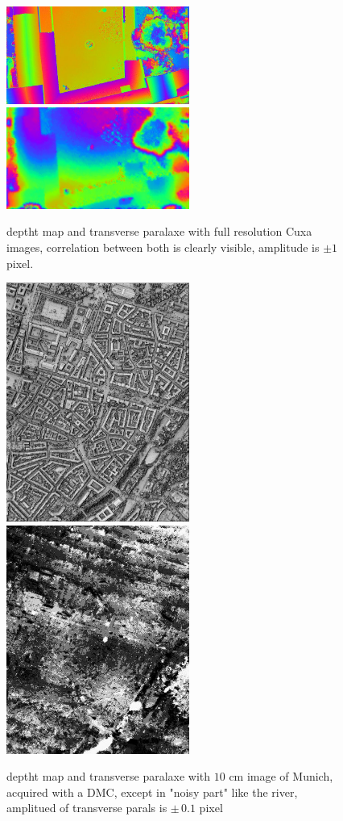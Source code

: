 \begin{figure}
\begin{center}
\includegraphics[width=60mm]{FIGS/TestOri/FullCuxPx1.jpg}
\includegraphics[width=60mm]{FIGS/TestOri/FullCuxPx2.jpg}
\end{center}
\caption{deptht map and transverse paralaxe with full resolution Cuxa images,
correlation between both is clearly visible, amplitude is $\pm 1$ pixel.
}
\label{FIG:CuxaFull:PxTr}
\end{figure}


\begin{figure}
\begin{center}
\includegraphics[width=60mm]{FIGS/TestOri/Mun1.jpg}
\includegraphics[width=60mm]{FIGS/TestOri/Mun2.jpg}
\end{center}
\caption{deptht map and transverse paralaxe with $10$ cm image of Munich, acquired with a DMC,
except in "noisy part" like the river, amplitued of transverse parals is $\pm\, 0.1$ pixel
}
\label{FIG:Mubich:PxTr}
\end{figure}




